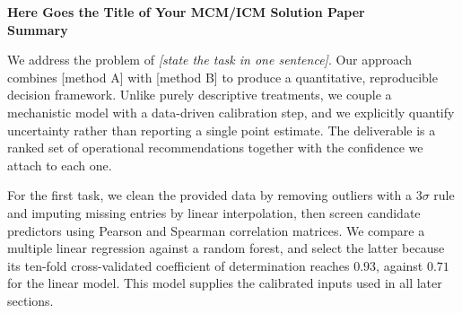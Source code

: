\documentclass[12pt]{article}
\begin{document}

\begin{center}
  {\large\bfseries
   Here Goes the Title of Your MCM/ICM Solution Paper}\\[6pt]
  {\normalsize\bfseries Summary}
\end{center}

\vspace{4pt}

We address the problem of \emph{[state the task in one sentence]}. Our approach combines
[method A] with [method B] to produce a quantitative, reproducible decision framework.
Unlike purely descriptive treatments, we couple a mechanistic model with a data-driven
calibration step, and we explicitly quantify uncertainty rather than reporting a single
point estimate. The deliverable is a ranked set of operational recommendations together
with the confidence we attach to each one.

For the first task, we clean the provided data by removing outliers with a $3\sigma$
rule and imputing missing entries by linear interpolation, then screen candidate
predictors using Pearson and Spearman correlation matrices. We compare a multiple linear
regression against a random forest, and select the latter because its ten-fold
cross-validated coefficient of determination reaches $0.93$, against $0.71$ for the
linear model. This model supplies the calibrated inputs used in all later sections.
\end{document}
